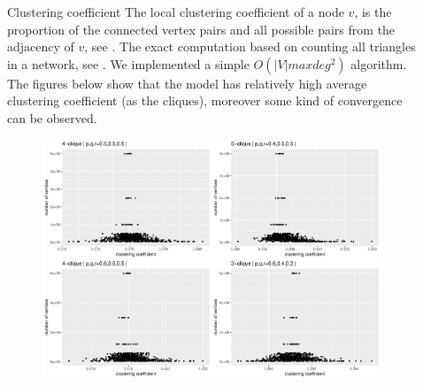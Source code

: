 \documentclass[final]{beamer}
\newlength{\sepwid}
\newlength{\onecolwid}
\newlength{\twocolwid}
\begin{document}
\begin{frame}[t]
\begin{columns}[t]
\begin{column}{\twocolwid}
\begin{columns}[t,totalwidth=\twocolwid]
\begin{column}{\onecolwid}
\begin{block}{Clustering coefficient}\small
  The local clustering coefficient of a node $v$, is the proportion of the connected 
  vertex pairs and all possible pairs from the adjacency of $v$, see \cite{WS}.
  The exact computation based on counting all triangles in a network, see \cite{Lat}. 
  We implemented a simple $O(|V|maxdeg^{2})$ algorithm. The figures below show that the 
  model has relatively high average clustering coefficient (as the cliques), moreover 
  some kind of convergence can be observed.
  \vskip 2cm
  \begin{figure} 
  \includegraphics[width=0.8\linewidth]{./fig/klikkclust4.pdf}
  \end{figure} 
\end{block}

\end{column}
\end{columns} %



\end{column}%

\begin{column}{\sepwid}\end{column} %

\begin{column}{\twocolwid} %

\begin{columns}[t,totalwidth=\twocolwid] %


\end{columns}
\end{column}
\end{columns}
\end{frame}
\end{document}
